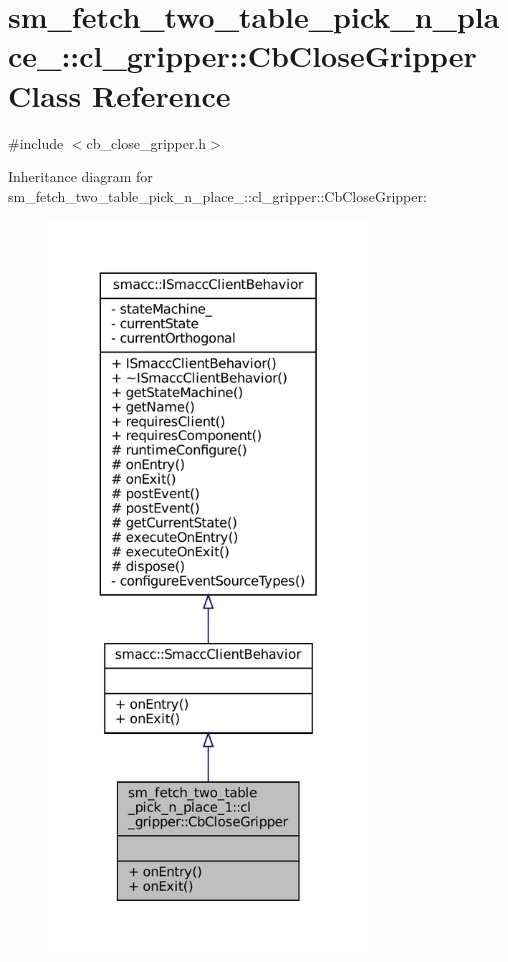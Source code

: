 \hypertarget{classsm__fetch__two__table__pick__n__place__1_1_1cl__gripper_1_1CbCloseGripper}{}\section{sm\+\_\+fetch\+\_\+two\+\_\+table\+\_\+pick\+\_\+n\+\_\+place\+\_\+:\+:cl\+\_\+gripper\+:\+:Cb\+Close\+Gripper Class Reference}
\label{classsm__fetch__two__table__pick__n__place__1_1_1cl__gripper_1_1CbCloseGripper}


{\ttfamily \#include $<$cb\+\_\+close\+\_\+gripper.\+h$>$}



Inheritance diagram for sm\+\_\+fetch\+\_\+two\+\_\+table\+\_\+pick\+\_\+n\+\_\+place\+\_\+:\+:cl\+\_\+gripper\+:\+:Cb\+Close\+Gripper\+:
\nopagebreak
\begin{figure}[H]
\begin{center}
\leavevmode
\includegraphics[height=550pt]{classsm__fetch__two__table__pick__n__place__1_1_1cl__gripper_1_1CbCloseGripper__inherit__graph}
\end{center}
\end{figure}


